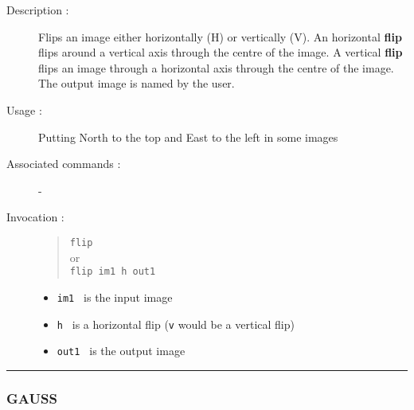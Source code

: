 \begin{description}

\item[Description :] Flips an image either horizontally (H) or
vertically (V). An horizontal {\bf flip} flips around a vertical axis
through the centre of the image.  A vertical {\bf flip} flips an image
through a horizontal axis through the centre of the image.  The output
image is named by the user.

\item[Usage :] Putting North to the top and East to the left in some images
\item[Associated commands :] -
\item[Invocation :]

\begin{quote}{\tt flip} \\
or \\
{\tt flip im1 h out1 }
\end{quote}

\begin{itemize}

\item {\tt im1 } is the input image
\item {\tt h } is a horizontal flip ({\tt v} would be a vertical flip)
\item {\tt out1 } is the output image
\end{itemize}

\end{description}

\hrule 
\subsubsection*{\label{GAUSS}GAUSS}

